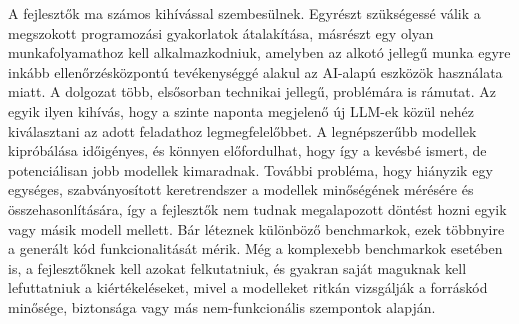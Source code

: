 \documentclass[12pt,a4paper]{extarticle}
\begin{document}
A fejlesztők ma számos kihívással szembesülnek.
Egyrészt szükségessé válik a meg\-szo\-kott programozási gyakorlatok átalakítása, másrészt egy olyan munkafolyamathoz kell alkalmazkodniuk, amelyben az alkotó jellegű munka egyre inkább ellenőrzésközpontú te\-vé\-keny\-ség\-gé alakul az AI-alapú eszközök használata miatt.
A dolgozat több, elsősorban technikai jellegű, problémára is rámutat.
Az egyik ilyen kihívás, hogy a szinte naponta megjelenő új LLM-ek közül nehéz kiválasztani az adott feladathoz legmegfelelőbbet.
A legnépszerűbb modellek kipróbálása időigényes, és könnyen előfordulhat, hogy így a ke\-vés\-bé ismert, de potenciálisan jobb modellek kimaradnak.
További probléma, hogy hi\-ány\-zik egy egységes, szabványosított keretrendszer a modellek minőségének mérésére és össze\-ha\-son\-lí\-tá\-sá\-ra, így a fejlesztők nem tudnak megalapozott döntést hozni egyik vagy másik modell mellett.
Bár léteznek különböző benchmarkok, ezek többnyire a generált kód funkcionalitását mérik.
Még a komplexebb benchmarkok esetében is, a fejlesztőknek kell azokat felkutatniuk, és gyakran saját maguknak kell lefuttatniuk a kiértékeléseket, mivel a modelleket ritkán vizsgálják a forráskód minősége, biztonsága vagy más nem-funkcionális szempontok alapján.
\end{document}
